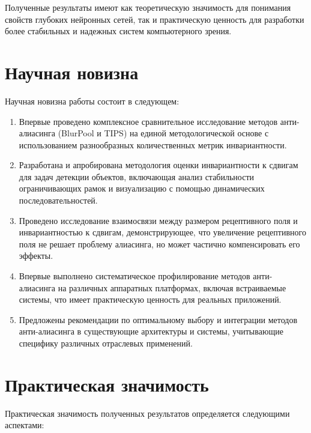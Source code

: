 Полученные результаты имеют как теоретическую значимость для понимания свойств глубоких нейронных сетей, так и практическую ценность для разработки более стабильных и надежных систем компьютерного зрения.

\section{Научная новизна}
\label{conclusion:novelty}

Научная новизна работы состоит в следующем:

\begin{enumerate}
    \item Впервые проведено комплексное сравнительное исследование методов анти-алиасинга (BlurPool и TIPS) на единой методологической основе с использованием разнообразных количественных метрик инвариантности.
    
    \item Разработана и апробирована методология оценки инвариантности к сдвигам для задач детекции объектов, включающая анализ стабильности ограничивающих рамок и визуализацию с помощью динамических последовательностей.
    
    \item Проведено исследование взаимосвязи между размером рецептивного поля и инвариантностью к сдвигам, демонстрирующее, что увеличение рецептивного поля не решает проблему алиасинга, но может частично компенсировать его эффекты.
    
    \item Впервые выполнено систематическое профилирование методов анти-алиасинга на различных аппаратных платформах, включая встраиваемые системы, что имеет практическую ценность для реальных приложений.
    
    \item Предложены рекомендации по оптимальному выбору и интеграции методов анти-алиасинга в существующие архитектуры и системы, учитывающие специфику различных отраслевых применений.
\end{enumerate}

\section{Практическая значимость}
\label{conclusion:significance}

Практическая значимость полученных результатов определяется следующими аспектами:

